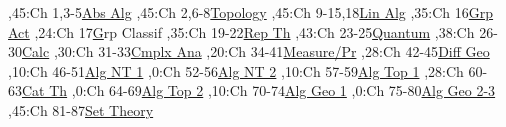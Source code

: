 
\bgroup
\renewcommand{\href}[1]{} %
\hypersetup{linkcolor=black} %
\renewcommand{\solidwidth}{0.7pt}
\renewcommand{\boldwidth}{1.5pt}

\setcounter{diagheight}{50}
\begin{chart}
,45:{Ch 1,3-5}{\hyperref[part:absalg]{Abs Alg}}{}
,45:{Ch 2,6-8}{\hyperref[part:basictop]{Topology}}{}
,45:{Ch 9-15,18}{\hyperref[part:linalg]{Lin Alg}}{}
,35:{Ch 16}{\hyperref[part:groups]{Grp Act}}{}
,24:{Ch 17}{\hyperref[chapter:sylow]Grp Classif}{}
,35:{Ch 19-22}{\hyperref[part:repth]{Rep Th}}{}
,43:{Ch 23-25}{\hyperref[part:quantum]{Quantum}}{}
,38:{Ch 26-30}{\hyperref[part:calc]{Calc}}{}
,30:{Ch 31-33}{\hyperref[part:cmplxana]{Cmplx Ana}}{}
,20:{Ch 34-41}{\hyperref[part:measure]{Measure/Pr}}{}
,28:{Ch 42-45}{\hyperref[part:diffgeo]{Diff Geo}}{}
,10:{Ch 46-51}{\hyperref[part:algnt1]{Alg NT 1}}{}
,0:{Ch 52-56}{\hyperref[part:algnt2]{Alg NT 2}}{}
,10:{Ch 57-59}{\hyperref[part:algtop1]{Alg Top 1}}{}
,28:{Ch 60-63}{\hyperref[part:cats]{Cat Th}}{}
,0:{Ch 64-69}{\hyperref[part:algtop2]{Alg Top 2}}{}
,10:{Ch 70-74}{\hyperref[part:ag1]{Alg Geo 1}}{}
,0:{Ch 75-80}{\hyperref[part:ag2]{Alg Geo 2-3}}{}
,45:{Ch 81-87}{\hyperref[part:st1]{Set Theory}}{}


\end{chart}
